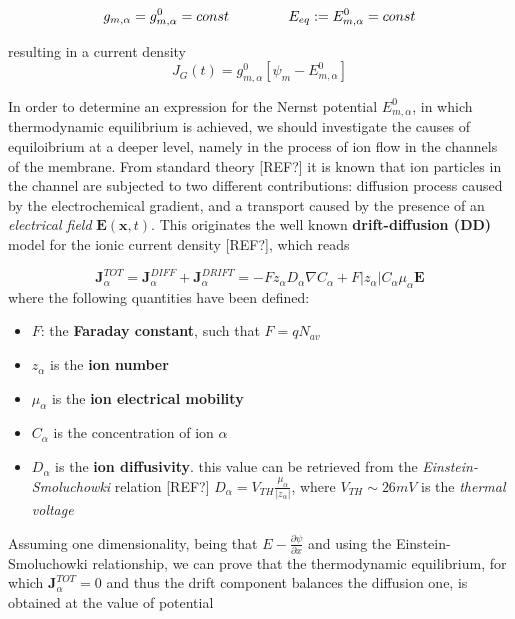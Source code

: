 \documentclass[a4paper]{article}
\begin{document}
\begin{equation}
g_{m,\alpha} = g_{m,\alpha}^0 = const \hspace{1.5 cm} E_{eq} := E_{m,\alpha}^0 =const 
\end{equation}

resulting in a current density
\begin{equation}
J_G(t) = g_{m,\alpha}^0 [\psi_m -  E_{m,\alpha}^0]
\end{equation}


In order to determine an expression for the Nernst potential $E_{m,\alpha}^0$, in which thermodynamic equilibrium is achieved, we should investigate the causes of equiloibrium at a deeper level, namely in the process of ion flow in the channels of the membrane. From standard theory [REF?] it is known that ion particles in the channel are subjected to two different contributions: diffusion process caused by the electrochemical gradient, and a transport caused by the presence of an \textit{electrical field} $\textbf{E}(\textbf{x},t)$. This originates the well known \textbf{drift-diffusion (DD)} model for the ionic current density [REF?], which reads

\begin{equation}
\textbf{J}_{\alpha}^{TOT} = \textbf{J}_{\alpha}^{DIFF} + \textbf{J}_{\alpha}^{DRIFT} = -Fz_{\alpha}D_{\alpha}\nabla C_{\alpha} + F|z_{\alpha}| C_{\alpha}\mu_{\alpha}\textbf{E}
\end{equation}
where the following quantities have been defined:
\begin{itemize}
	
	\item $F$: the \textbf{Faraday constant}, such that $F = q N_{av}$
	
	\item $z_{\alpha}$ is the \textbf{ion number}
	
	\item $\mu_{\alpha}$ is the \textbf{ion electrical mobility}
	
	\item $C_{\alpha}$ is the concentration of ion $\alpha$
	
	\item $D_{\alpha}$ is the \textbf{ion diffusivity}. this value can be retrieved from the \textit{Einstein-Smoluchowki} relation [REF?] $D_{\alpha} = V_{TH}\frac{\mu_{\alpha}}{|z_{\alpha}|}$, where $ V_{TH} \sim 26 mV$ is the \textit{thermal voltage}
\end{itemize}

Assuming one dimensionality, being that $ E -\frac{\partial \psi}{\partial x}$ and using the Einstein-Smoluchowki relationship, we can prove that the thermodynamic equilibrium, for which $\textbf{J}_{\alpha}^{TOT} = 0$ and thus the drift component balances the diffusion one, is obtained at the value of potential
\end{document}

